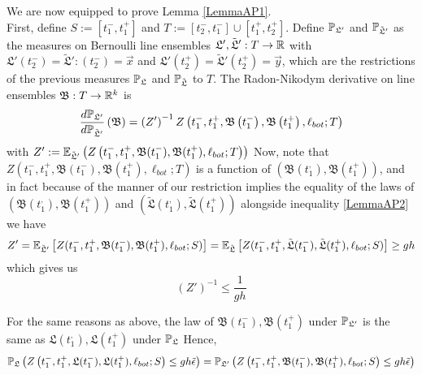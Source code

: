 	We are now equipped to prove Lemma \ref{LemmaAP1}.\\ 
	
	First, define $S:=[t_1^-, t_1^+]$ and $T:=[t_2^-, t_1^-]\cup [t_1^+,t_2^+]$. Define $\mathbb{P}_{\mathfrak L'}$ and $\mathbb{P}_{\tilde{\mathfrak{L}}'}$ as the measures on Bernoulli line ensembles $\mathfrak L', \tilde{\mathfrak{L}}': T\to \mathbb{R}$ with $\mathfrak L'(t_2^-)=\tilde{\mathfrak{L}}':(t_2^-)=\vec x$ and $\mathfrak L'(t_2^+)=\tilde{\mathfrak{L}}'(t_2^+)=\vec y$, which are the restrictions of the previous measures $\mathbb{P}_{\mathfrak L}$ and $\mathbb{P}_{\tilde{\mathfrak{L}}}$ to $T$. The Radon-Nikodym derivative on line ensembles $\mathfrak B: T\to \mathbb{R}^k$ is \begin{equation}\label{propRadon}\frac{d\mathbb{P}_{\mathfrak L'}}{d\mathbb{P}_{\tilde{\mathfrak L}'}}\left(\mathfrak B\right)=\left(Z'\right)^{-1}Z\left(t_1^-,t_1^+,\mathfrak{B}\left(t_1^-\right),\mathfrak{B}\left(t_1^+\right),\ell_{bot};T\right)
	\end{equation}
	with $Z':=\mathbb{E}_{\tilde{\mathfrak{L}}'}\left(Z\left(t_1^-, t_1^+, \mathfrak B(t_1^-), \mathfrak B(t_1^+), \ell_{bot}; T\right)\right)$ Now, note that $Z\left(t_1^-, t_1^+, \mathfrak B(t_1^-), \mathfrak B(t_1^+), \ell_{bot}; T\right)$ is a function of $(\mathfrak B(t_1^,), \mathfrak B(t_1^+))$, and in fact because of the manner of our restriction implies the equality of the laws of $\left(\mathfrak B(t_1^,), \mathfrak B(t_1^+)\right)$ and $(\tilde{\mathfrak L}(t_1^,), \tilde{\mathfrak L}(t_1^+))$ alongside inequality \ref{LemmaAP2} we have
	\[
	Z'=\mathbb{E}_{\tilde{\mathfrak{L}}'}\left[Z(t_1^-, t_1^+, \mathfrak B(t_1^-),\mathfrak B(t_1^+),\ell_{bot};S)\right]=\mathbb{E}_{\tilde{\mathfrak{L}}}\left[Z(t_1^-, t_1^+, \tilde{\mathfrak L}(t_1^-),\tilde{\mathfrak L}(t_1^+),\ell_{bot};S)\right]\geq gh
\]
which gives us 
\begin{equation}
	\label{Zineq} \left(Z'\right)^{-1}\leq \frac{1}{gh}
\end{equation}

	For the same reasons as above, the law of $\mathfrak B(t_1^-), \mathfrak{B}(t_1^+)$ under $\mathbb{P}_{\mathfrak L'}$ is the same as $\mathfrak L(t_1^,), \mathfrak L(t_1^+)$ under $\mathbb{P}_{\mathfrak L}$ Hence,
	\begin{equation}
	\mathbb{P}_{\mathfrak L}\left(Z\left(t_1^-,t_1^+,\mathfrak L(t_1^-),\mathfrak L(t_1^+),\ell_{bot};S\right)\leq gh\tilde \epsilon\right)=\mathbb{P}_{\mathfrak L'}\left(Z\left(t_1^-,t_1^+,\mathfrak B(t_1^-),\mathfrak B(t_1^+),\ell_{bot};S\right)\leq gh\tilde \epsilon\right)
	\end{equation}
	
